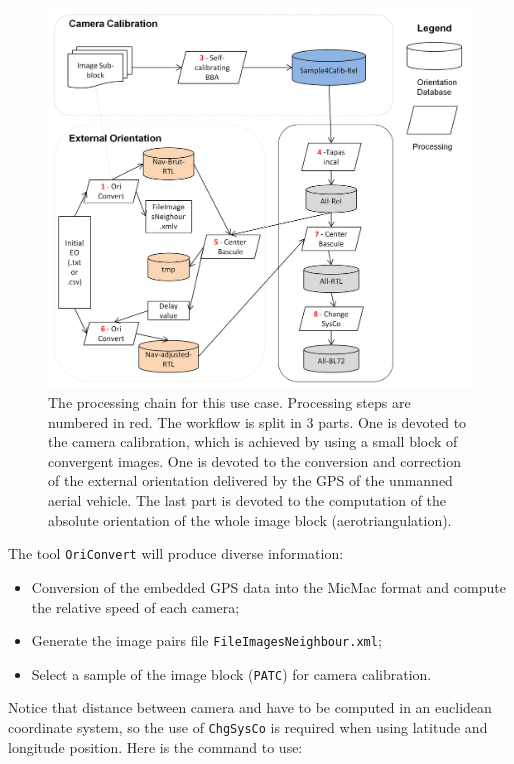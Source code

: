 \begin{figure}[H]
\centering
\includegraphics[width=0.9\linewidth]{FIGS/UASGrandLeez/workflow_UASGL.png}
\caption{The processing chain for this use case. Processing steps are numbered in red. The workflow is split in 3 parts. One is devoted to the camera calibration, which is achieved by using a small block of convergent images. One is devoted to the conversion and correction of the  external orientation delivered by the GPS of the unmanned aerial vehicle. The last part is devoted to the computation of the absolute orientation of the whole image block (aerotriangulation). }
\label{FIG:workflowGL}
\end{figure}

\vspace{\baselineskip}
The tool { \tt OriConvert} will produce diverse information:
\begin{itemize}
\item Conversion of the embedded GPS data into the MicMac format and compute the relative speed of each camera;
\item Generate the image pairs file {\tt FileImagesNeighbour.xml};
\item Select a sample of the image block ({\tt PATC}) for camera calibration.
\end{itemize}
\vspace{\baselineskip}
Notice that distance between camera and have to be computed in an euclidean coordinate system, so the use of {\tt ChgSysCo} is required when using latitude and longitude position. Here is the command to use:

